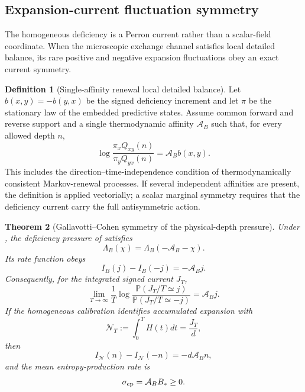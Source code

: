 \documentclass[11pt]{article}
\newtheorem{theorem}{Theorem}[section]
\theoremstyle{definition}
\newtheorem{definition}[theorem]{Definition}
\theoremstyle{remark}
\begin{document}
\subsection{Expansion-current fluctuation symmetry}
\label{subsec:expansion-fluctuation-theorem}

The homogeneous deficiency is a Perron current rather than a scalar-field
coordinate.  When the microscopic exchange channel satisfies local detailed
balance, its rare positive and negative expansion fluctuations obey an exact
current symmetry.

\begin{definition}[Single-affinity renewal local detailed balance]
\label{def:renewal-local-detailed-balance}
Let \(b(x,y)=-b(y,x)\) be the signed deficiency increment and let \(\pi\) be the
stationary law of the embedded predictive states.  Assume common forward and
reverse support and a single thermodynamic affinity \(\mathcal A_B\) such that,
for every allowed depth \(n\),
\[
  \log\frac{\pi_xQ_{xy}(n)}{\pi_yQ_{yx}(n)}
  =\mathcal A_B b(x,y).
\]
This includes the direction--time-independence condition of thermodynamically
consistent Markov-renewal processes.  If several independent affinities are
present, the definition is applied vectorially; a scalar marginal symmetry
requires that the deficiency current carry the full antisymmetric action.
\end{definition}

\begin{theorem}[Gallavotti--Cohen symmetry of the physical-depth pressure]
\label{thm:renewal-gc-symmetry}
Under , the deficiency pressure of
 satisfies
\[
  \boxed{\qquad
  \Lambda_B(\chi)=\Lambda_B(-\mathcal A_B-\chi).
  \qquad}
\]
Its rate function obeys
\[
  \boxed{\qquad
  I_B(j)-I_B(-j)=-\mathcal A_B j.
  \qquad}
\]
Consequently, for the integrated signed current \(J_T\),
\[
 \lim_{T\to\infty}\frac1T
 \log\frac{\mathbb P(J_T/T\simeq j)}
          {\mathbb P(J_T/T\simeq-j)}
 =\mathcal A_Bj.
\]
If the homogeneous calibration identifies accumulated expansion with
\[
  \mathcal N_T:=\int_0^TH(t)dt=\frac{J_T}{d},
\]
then
\[
  I_{\mathcal N}(n)-I_{\mathcal N}(-n)
  =-d\mathcal A_Bn,
\]
and the mean entropy-production rate is
\[
  \sigma_{\rm ep}=\mathcal A_B B_*\ge0.
\]
\end{theorem}
\end{document}
